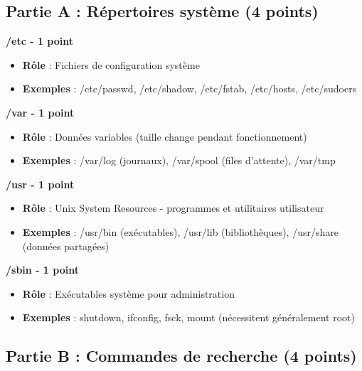 \documentclass[12pt,a4paper]{article}
\begin{document}
\subsection*{Partie A : Répertoires système (4 points)}

\begin{answerbox}
\textbf{/etc - 1 point}
\begin{itemize}
    \item \textbf{Rôle} : Fichiers de configuration système
    \item \textbf{Exemples} : /etc/passwd, /etc/shadow, /etc/fstab, /etc/hosts, /etc/sudoers
\end{itemize}

\textbf{/var - 1 point}
\begin{itemize}
    \item \textbf{Rôle} : Données variables (taille change pendant fonctionnement)
    \item \textbf{Exemples} : /var/log (journaux), /var/spool (files d'attente), /var/tmp
\end{itemize}

\textbf{/usr - 1 point}
\begin{itemize}
    \item \textbf{Rôle} : Unix System Resources - programmes et utilitaires utilisateur
    \item \textbf{Exemples} : /usr/bin (exécutables), /usr/lib (bibliothèques), /usr/share (données partagées)
\end{itemize}

\textbf{/sbin - 1 point}
\begin{itemize}
    \item \textbf{Rôle} : Exécutables système pour administration
    \item \textbf{Exemples} : shutdown, ifconfig, fsck, mount (nécessitent généralement root)
\end{itemize}
\end{answerbox}

\subsection*{Partie B : Commandes de recherche (4 points)}
\end{document}
